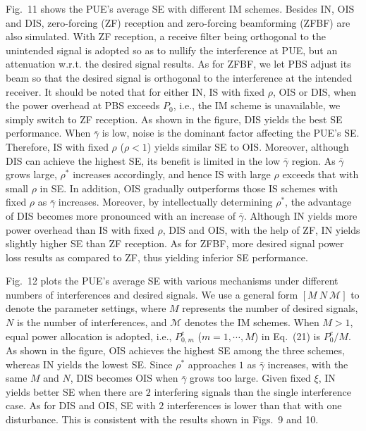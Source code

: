 \documentclass[10pt, conference, letterpaper]{IEEEtran}
\begin{document}
Fig.~11 shows the PUE's average SE with different IM schemes.
Besides IN, OIS and DIS,
zero-forcing (ZF) reception and zero-forcing beamforming (ZFBF) are also simulated.
With ZF reception, a receive filter being orthogonal to the unintended signal is adopted
so as to nullify the interference at PUE, but an attenuation w.r.t. the desired signal results.
As for ZFBF, we let PBS adjust its beam so that the desired signal
is orthogonal to the interference at the intended receiver.
It should be noted that for either IN, IS with fixed $\rho$, OIS or DIS,
when the power overhead at PBS exceeds $P_{0}$,
i.e., the IM scheme is unavailable, we simply switch to ZF reception.
As shown in the figure, DIS yields the best SE performance.
When $\bar{\gamma}$ is low, noise is the dominant factor affecting the PUE's SE.
Therefore, IS with fixed $\rho$ ($\rho<1$) yields similar %
SE to OIS.
Moreover, although DIS can achieve the highest SE, its benefit is limited
in the low $\bar{\gamma}$ region.
As $\bar{\gamma}$ grows large, $\rho^{*}$ increases accordingly,
and hence IS with large $\rho$ exceeds that with small $\rho$ in SE.
In addition, OIS gradually outperforms those IS schemes with fixed $\rho$
as $\bar{\gamma}$ increases.
Moreover, by intellectually determining $\rho^{*}$,
the advantage of DIS becomes more pronounced with an increase of $\bar{\gamma}$.
Although IN yields more power overhead than IS with fixed $\rho$,
DIS and OIS, with the help of ZF, IN yields slightly higher SE than ZF reception.
As for ZFBF, more desired signal power loss results as compared to ZF,
thus yielding inferior SE performance.

Fig.~12 plots the PUE's average SE with various mechanisms under
different numbers of interferences and desired signals.
We use a general form $[M~N~\mathcal{M}]$ to denote the parameter settings,
where $M$ represents the number of desired signals,
$N$ is the number of interferences,
and $\mathcal{M}$ denotes the IM schemes.
When $M>1$, equal power allocation is adopted,
i.e., $P^{e}_{0,m}$ ($m=1,\cdots,M$) in Eq.~(21) is $P^{e}_{0}/M$.
As shown in the figure, OIS achieves the highest SE among
the three schemes, whereas IN yields the lowest SE.
Since $\rho^{*}$ approaches $1$ as $\bar{\gamma}$ increases,
with the same $M$ and $N$, DIS becomes OIS when $\bar{\gamma}$ grows too large.
Given fixed $\xi$, IN yields better SE when there are $2$ interfering signals
than the single interference case.
As for DIS and OIS, SE with $2$ interferences is lower than that with one disturbance.
This is consistent with the results shown in Figs.~9 and 10.
\end{document}
